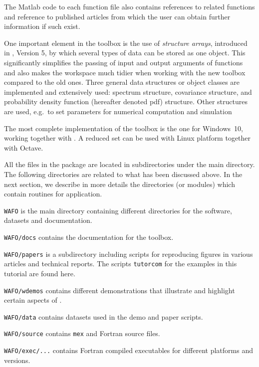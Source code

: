 The Matlab code to each function file also contains references to
related functions and  reference to published
articles from which the user can obtain further information if such exist.

One important element in the toolbox is the use of
\textsl{structure arrays}, introduced in \ML{}, Version 5, by which
several types of data can be stored as one object.
This significantly simplifies the passing of input and output arguments
of functions and also makes the \ML{} workspace much tidier when working
with the new toolbox compared to the old ones.
Three general data structures or object classes are implemented and
extensively used: spectrum structure, covariance structure, and
probability density function (hereafter denoted pdf) structure. 
Other structures are used, e.g.\ to set parameters for numerical computation and  
simulation 

The most complete implementation of the \wf{} toolbox is  the 
one for Windows~10, working together with \ML{}. A reduced set can be 
used with Linux platform together with {\sc Octave}. 



All the files in the package are located in subdirectories under the main
directory. The following directories are related to what has been
discussed above. In the next section, we describe in more details the
directories (or modules) which contain routines for application.
\begin{description}\setlength\itemsep{-1mm}
\item[] \verb+WAFO+ is the main directory containing different directories for the
  \progname{} software, datasets and documentation.
\item[] \verb+WAFO/docs+ contains the documentation for the toolbox.
\item[] \verb+WAFO/papers+ is a subdirectory including scripts for reproducing
  figures in various articles and technical reports. The scripts {\tt tutorcom} 
  for the examples in this tutorial are found here.
\item[] \verb+WAFO/wdemos+ contains different demonstrations that illustrate and
  highlight certain aspects of \progname{}.
\item[] \verb+WAFO/data+ contains datasets used in the demo and paper scripts.
\item[] \verb+WAFO/source+ contains {\tt mex} and {\sc Fortran} source files.
\item[] \verb+WAFO/exec/...+ contains {\sc Fortran} compiled executables for different
  platforms and \ML{} versions.
\end{description}

